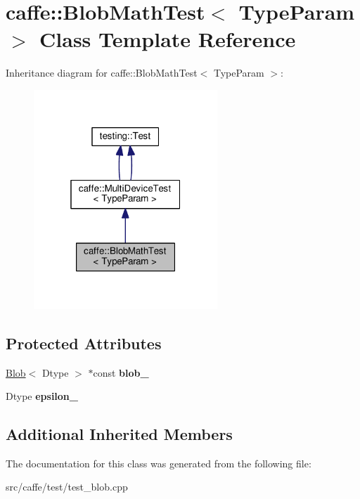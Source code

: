 \hypertarget{classcaffe_1_1_blob_math_test}{}\section{caffe\+:\+:Blob\+Math\+Test$<$ Type\+Param $>$ Class Template Reference}
\label{classcaffe_1_1_blob_math_test}


Inheritance diagram for caffe\+:\+:Blob\+Math\+Test$<$ Type\+Param $>$\+:
\nopagebreak
\begin{figure}[H]
\begin{center}
\leavevmode
\includegraphics[width=196pt]{classcaffe_1_1_blob_math_test__inherit__graph}
\end{center}
\end{figure}
\subsection*{Protected Attributes}
\begin{DoxyCompactItemize}
\item 
\mbox{\label{classcaffe_1_1_blob_math_test_a3262b79f7de9c3d1b05129ab1cc8be55}} 
\mbox{\hyperlink{classcaffe_1_1_blob}{Blob}}$<$ Dtype $>$ $\ast$const {\bfseries blob\+\_\+}
\item 
\mbox{\label{classcaffe_1_1_blob_math_test_ac9411f1a78485d7e69d7addc1bdd07c4}} 
Dtype {\bfseries epsilon\+\_\+}
\end{DoxyCompactItemize}
\subsection*{Additional Inherited Members}


The documentation for this class was generated from the following file\+:\begin{DoxyCompactItemize}
\item 
src/caffe/test/test\+\_\+blob.\+cpp\end{DoxyCompactItemize}

